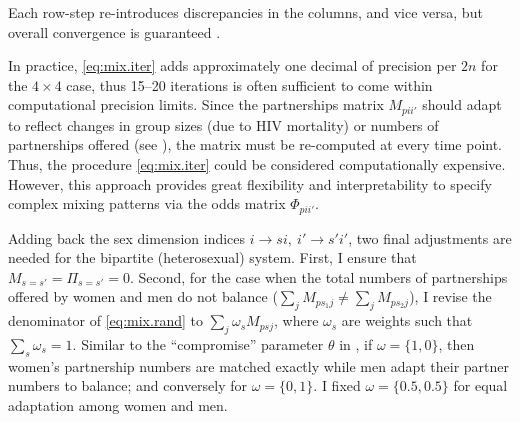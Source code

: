 Each row-step re-introduces discrepancies in the columns, and vice versa,
but overall convergence is guaranteed \cite{Sinkhorn1964}.
\par
In practice, \eqref{eq:mix.iter} adds approximately
one decimal of precision per $2n$ for the $4\times4$ case,
thus 15--20 iterations is often sufficient to come within computational precision limits.
Since the partnerships matrix $M_{pii'}$ should adapt to reflect changes in
group sizes (\eg due to HIV mortality) or
numbers of partnerships offered (\eg see ),
the matrix must be re-computed at every time point.
Thus, the procedure \eqref{eq:mix.iter} could be considered computationally expensive.
However, this approach provides great flexibility and interpretability
to specify complex mixing patterns via the odds matrix $\Phi_{pii'}$.
\par
Adding back the sex dimension indices $i \rightarrow si, ~ i' \rightarrow s'i'$,
two final adjustments are needed for the bipartite (\ie heterosexual) system.
First, I ensure that $M_{s=s'} = \Pi_{s=s'} = 0$.
Second, for the case when the total numbers of partnerships offered by women and men
do not balance ($\sum_j M_{ps_{1}j} \ne \sum_j M_{ps_{2}j}$),
I revise the denominator of \eqref{eq:mix.rand} to $\sum_{j} \omega_s M_{psj}$,
where $\omega_s$ are weights such that $\sum_s \omega_s = 1$.
Similar to the ``compromise'' parameter $\theta$ in \cite{Garnett1994},
if $\omega = \{1,0\}$, then women's partnership numbers are matched exactly
while men adapt their partner numbers to balance;
and conversely for $\omega = \{0,1\}$.
I fixed $\omega = \{0.5,0.5\}$ for equal adaptation among women and men.
